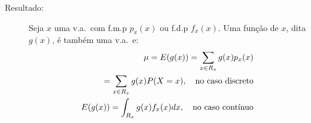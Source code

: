 \documentclass[11pt,a4paper]{book}
\begin{document}
\begin{description}


   \item [Resultado:] Seja $x$ uma v.a.\ com f.m.p $p_{x}(x)$ ou f.d.p $f_{x}(x)$. Uma função
     de $x$, dita $g(x)$, é também uma v.a.\ e: 
     \begin{align}
       \mu=E(g(x))=\sum_{x \in R_{x}} g(x)p_{x}(x)\\
       =\sum_{x \in R_{x}} g(x)P(X=x), \text{\quad no caso discreto} \nonumber \\
       E(g(x))=\int_{R_{x}} g(x)f_{x}(x)dx, \text{\quad no caso contínuo}
     \end{align}

 \end{description}
\end{document}
